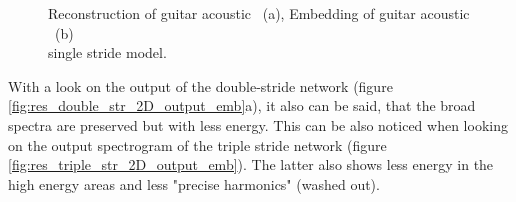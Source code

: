 \begin{figure}[htb!]
    \centering
    \captionsetup{justification=centering}
    \caption{Reconstruction of guitar acoustic ~(a), Embedding of guitar acoustic ~(b)\\single stride model.}
    \label{fig:res_single_str_2D_output_emb}
\end{figure}

With a look on the output of the double-stride network (figure \ref{fig:res_double_str_2D_output_emb}a), it also can be said, that the broad spectra are preserved but with less energy. This can be also noticed when looking on the output spectrogram of the triple stride network (figure \ref{fig:res_triple_str_2D_output_emb}). The latter also shows less energy in the high energy areas and less "precise harmonics" (washed out). 


